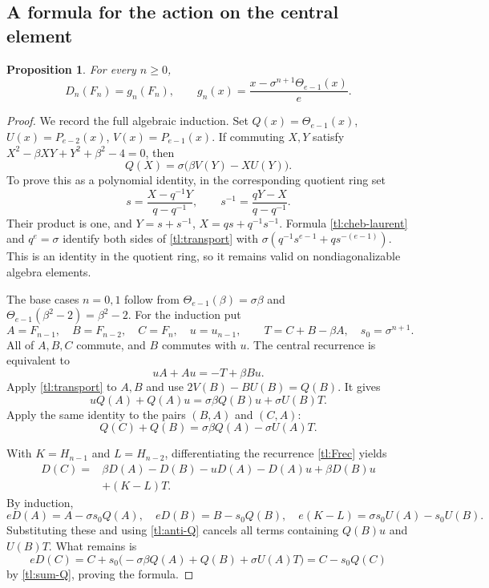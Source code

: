 \documentclass[a4paper,11pt,oneside,reqno]{amsart}
\newtheorem{proposition}[theorem]{Proposition}
\theoremstyle{definition}
\numberwithin{equation}{section}
\begin{document}
	\subsection{A formula for the action on the central element}
	\begin{proposition}\label{tl:DF}
		For every $n\ge0$,
		\begin{equation}\label{tl:DF-formula}
			\boxed{D_n(F_n)=g_n(F_n),\qquad
				g_n(x)=\frac{x-\sigma^{n+1}\Theta_{e-1}(x)}e.}
		\end{equation}
	\end{proposition}
	\begin{proof}
		We record the full algebraic induction.  Set
		$Q(x)=\Theta_{e-1}(x)$, $U(x)=P_{e-2}(x)$,
		$V(x)=P_{e-1}(x)$.
		If commuting $X,Y$ satisfy
		$X^2-\beta XY+Y^2+\beta^2-4=0$, then
		\begin{equation}\label{tl:transport}
			Q(X)=\sigma\bigl(\beta V(Y)-XU(Y)\bigr).
		\end{equation}
		To prove this as a polynomial identity, in the corresponding quotient
		ring set
		\[
		s=\frac{X-q^{-1}Y}{q-q^{-1}},\qquad
		s^{-1}=\frac{qY-X}{q-q^{-1}}.
		\]
		Their product is one, and $Y=s+s^{-1}$,
		$X=qs+q^{-1}s^{-1}$.  Formula \eqref{tl:cheb-laurent} and
		$q^e=\sigma$ identify both sides of \eqref{tl:transport} with
		$\sigma(q^{-1}s^{e-1}+qs^{-(e-1)})$.
		This is an identity in the quotient ring, so it remains valid on
		nondiagonalizable algebra elements.
		
		The base cases $n=0,1$ follow from
		$\Theta_{e-1}(\beta)=\sigma\beta$ and
		$\Theta_{e-1}(\beta^2-2)=\beta^2-2$.
		For the induction put
		\[
		A=F_{n-1},\quad B=F_{n-2},\quad C=F_n,\quad u=u_{n-1},
		\qquad T=C+B-\beta A,\quad s_0=\sigma^{n+1}.
		\]
		All of $A,B,C$ commute, and $B$ commutes with $u$.
		The central recurrence is equivalent to
		\begin{equation}\label{tl:anti-A}
			uA+Au=-T+\beta Bu.
		\end{equation}
		Apply \eqref{tl:transport} to $A,B$ and use
		$2V(B)-BU(B)=Q(B)$.  It gives
		\begin{equation}\label{tl:anti-Q}
			uQ(A)+Q(A)u=\sigma\beta Q(B)u+\sigma U(B)T.
		\end{equation}
		Apply the same identity to the pairs $(B,A)$ and $(C,A)$:
		\begin{equation}\label{tl:sum-Q}
			Q(C)+Q(B)=\sigma\beta Q(A)-\sigma U(A)T.
		\end{equation}
		
		With $K=H_{n-1}$ and $L=H_{n-2}$, differentiating the recurrence
		\eqref{tl:Frec} yields
		\[
		\begin{aligned}
			D(C)={}&\beta D(A)-D(B)-uD(A)-D(A)u+\beta D(B)u\\
			&+(K-L)T.
		\end{aligned}
		\]
		By induction,
		\[
		eD(A)=A-\sigma s_0Q(A),\quad eD(B)=B-s_0Q(B),\quad
		e(K-L)=\sigma s_0U(A)-s_0U(B).
		\]
		Substituting these and using \eqref{tl:anti-Q} cancels all terms
		containing $Q(B)u$ and $U(B)T$.  What remains is
		\[
		eD(C)=C+s_0\bigl(-\sigma\beta Q(A)+Q(B)+\sigma U(A)T\bigr)
		=C-s_0Q(C)
		\]
		by \eqref{tl:sum-Q}, proving the formula.
	\end{proof}
	
\end{document}
